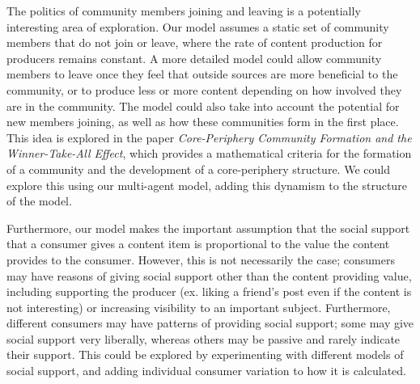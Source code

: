 \documentclass[11pt, letterpaper]{article}
\begin{document}
The politics of community members joining and leaving is a potentially interesting area of exploration. Our model assumes a static set of community members that do not join or leave, where the rate of content production for producers remains constant. A more detailed model could allow community members to leave once they feel that outside sources are more beneficial to the community, or to produce less or more content depending on how involved they are in the community. The model could also take into account the potential for new members joining, as well as how these communities form in the first place. This idea is explored in the paper \textit{Core-Periphery Community Formation and the Winner-Take-All Effect}, which provides a mathematical criteria for the formation of a community and the development of a core-periphery structure. We could explore this using our multi-agent model, adding this dynamism to the structure of the model.

Furthermore, our model makes the important assumption that the social support that a consumer gives a content item is proportional to the value the content provides to the consumer. However, this is not necessarily the case; consumers may have reasons of giving social support other than the content providing value, including supporting the producer (ex. liking a friend's post even if the content is not interesting) or increasing visibility to an important subject. Furthermore, different consumers may have patterns of providing social support; some may give social support very liberally, whereas others may be passive and rarely indicate their support. This could be explored by experimenting with different models of social support, and adding individual consumer variation to how it is calculated.
\end{document}
